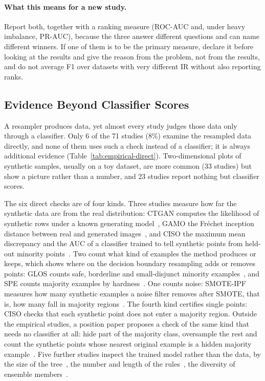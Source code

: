 \paragraph{What this means for a new study.} Report both, together with a ranking measure (ROC-AUC and, under heavy imbalance, PR-AUC), because the three answer different questions and can name different winners. If one of them is to be the primary measure, declare it before looking at the results and give the reason from the problem, not from the results, and do not average F1 over datasets with very different IR without also reporting ranks.

\subsection{Evidence Beyond Classifier Scores}
\label{sec:empirical-direct}

A resampler produces data, yet almost every study judges those data only through a classifier. Only 6 of the 71 studies (8\%) examine the resampled data directly, and none of them uses such a check instead of a classifier; it is always additional evidence (Table~\ref{tab:empirical-direct}). Two-dimensional plots of synthetic samples, usually on a toy dataset, are more common (33 studies) but show a picture rather than a number, and 23 studies report nothing but classifier scores.



The six direct checks are of four kinds. Three studies measure how far the synthetic data are from the real distribution: CTGAN computes the likelihood of synthetic rows under a known generating model~\parencite{xu2019ctgan}, GAMO the Fréchet inception distance between real and generated images~\parencite{mullick2019gamo}, and CISO the maximum mean discrepancy and the AUC of a classifier trained to tell synthetic points from held-out minority points~\parencite{yadav2025ciso}. Two count what kind of examples the method produces or keeps, which shows where on the decision boundary resampling adds or removes points: GLOS counts safe, borderline and small-disjunct minority examples~\parencite{han2023glos}, and SPE counts majority examples by hardness~\parencite{liu2020spe}. One counts noise: SMOTE-IPF measures how many synthetic examples a noise filter removes after SMOTE, that is, how many fall in majority regions~\parencite{saez2015smoteipf}. The fourth kind certifies single points: CISO checks that each synthetic point does not enter a majority region. Outside the empirical studies, a position paper proposes a check of the same kind that needs no classifier at all: hide part of the majority class, oversample the rest and count the synthetic points whose nearest original example is a hidden majority example~\parencite{hassanat2022stop}. Five further studies inspect the trained model rather than the data, by the size of the tree~\parencite{chawla2002smote,janicka2019soup}, the number and length of the rules~\parencite{batista2004study}, the diversity of ensemble members~\parencite{diezpastor2015randombalance,zhu2023orem}.

